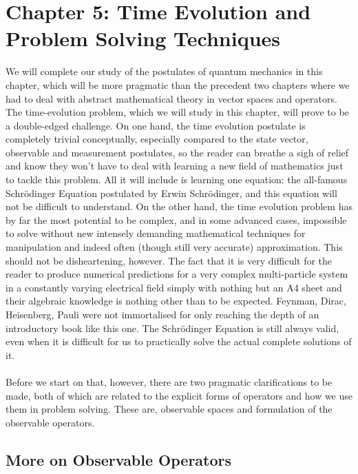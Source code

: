 \chapter{Chapter 5: Time Evolution and Problem Solving Techniques}
We will complete our study of the postulates of quantum mechanics in this chapter, which will be more pragmatic than the precedent two chapters where we had to deal with abstract mathematical theory in vector spaces and operators. The time-evolution problem, which we will study in this chapter, will prove to be a double-edged challenge. On one hand, the time evolution postulate is completely trivial conceptually, especially compared to the state vector, observable and measurement postulates, so the reader can breathe a sigh of relief and know they won't have to deal with learning a new field of mathematics just to tackle this problem. All it will include is learning one equation: the all-famous Schr\"{o}dinger Equation postulated by Erwin Schr\"{o}dinger, and this equation will not be difficult to understand. On the other hand, the time evolution problem has by far the most potential to be complex, and in some advanced cases, impossible to solve without new intensely demanding mathematical techniques for manipulation and indeed often (though still very accurate) approximation. This should not be disheartening, however. The fact that it is very difficult for the reader to produce numerical predictions for a very complex multi-particle system in a constantly varying electrical field simply with nothing but an A4 sheet and their algebraic knowledge is nothing other than to be expected. Feynman, Dirac, Heisenberg, Pauli were not immortalised for only reaching the depth of an introductory book like this one. The Schr\"{o}dinger Equation is still always valid, even when it is difficult for us to practically solve the actual complete solutions of it.
\\\\
Before we start on that, however, there are two pragmatic clarifications to be made, both of which are related to the explicit forms of operators and how we use them in problem solving. These are, observable spaces and formulation of the observable operators. 
\section{More on Observable Operators}
